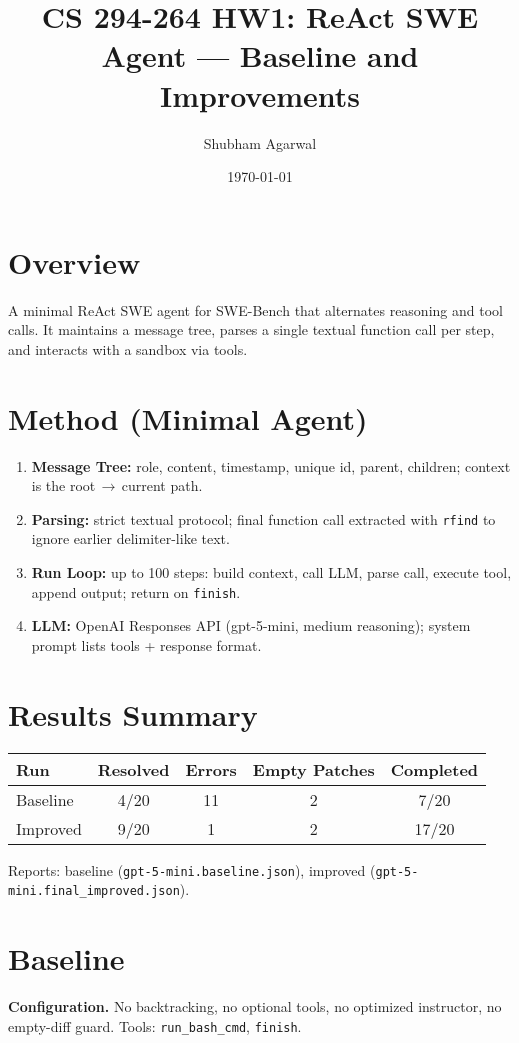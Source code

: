 \documentclass[11pt]{article}
\title{CS 294-264 HW1: ReAct SWE Agent — Baseline and Improvements}
\author{Shubham Agarwal}
\date{\today}
\begin{document}
\maketitle

\section*{Overview}
A minimal ReAct SWE agent for SWE-Bench that alternates reasoning and tool calls. It maintains a message tree, parses a single textual function call per step, and interacts with a sandbox via tools.

\section*{Method (Minimal Agent)}
\begin{enumerate}
    \item \textbf{Message Tree:} role, content, timestamp, unique id, parent, children; context is the root\,$\to$\,current path.
    \item \textbf{Parsing:} strict textual protocol; final function call extracted with \texttt{rfind} to ignore earlier delimiter-like text.
    \item \textbf{Run Loop:} up to 100 steps: build context, call LLM, parse call, execute tool, append output; return on \texttt{finish}.
    \item \textbf{LLM:} OpenAI Responses API (gpt-5-mini, medium reasoning); system prompt lists tools + response format.
\end{enumerate}

\section*{Results Summary}
\begin{center}
\begin{tabular}{lcccc}
\toprule
Run & Resolved & Errors & Empty Patches & Completed \\
\midrule
Baseline & 4/20 & 11 & 2 & 7/20 \\
Improved & 9/20 & 1 & 2 & 17/20 \\
\bottomrule
\end{tabular}
\end{center}
Reports: baseline (\texttt{gpt-5-mini.baseline.json}), improved (\texttt{gpt-5-mini.final\_improved.json}).

\section*{Baseline}
\textbf{Configuration.} No backtracking, no optional tools, no optimized instructor, no empty-diff guard. Tools: \texttt{run\_bash\_cmd}, \texttt{finish}.
\end{document}
